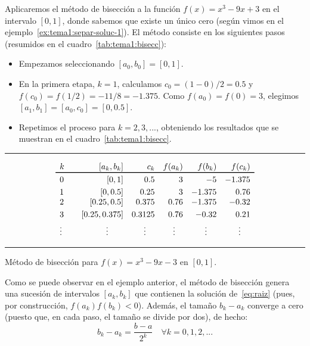 \begin{example}
  Aplicaremos el método de bisección a la función $f(x)=x^3-9x+3$ en el intervalo
  $[0,1]$, donde sabemos que existe un único cero (según vimos en el
  ejemplo~\ref{ex:tema1:separ-soluc-1}). El método consiste en los
  siguientes pasos (resumidos en el cuadro~\ref{tab:tema1:bisecc}):

  \begin{itemize}
  \item Empezamos seleccionando $[a_0,b_0]=[0,1]$.
  \item En la primera etapa, $k=1$, calculamos 
    $c_0=(1-0)/2=0.5$  y 
    $f(c_0)=f(1/2)=-11/8=-1.375$. Como $f(a_0)=f(0)=3$, elegimos
    $[a_1,b_1]=[a_0,c_0]=[0,0.5]$.
  \item Repetimos el proceso para $k=2,3,...$, obteniendo los resultados que se
    muestran en el cuadro~\ref{tab:tema1:bisecc}.
  \end{itemize}

\end{example}
\begin{table}
  \centering
  \rule{0.99\linewidth}{1.6pt}
  \begin{equation*}
    \begin{array}{l<{\quad}rrrrr}%
     k &  [a_k,b_k] & c_k & f(a_k) & f(b_k) & f(c_k) 
      \\ \toprule%
     0 & [0,1]  &  0.5 
      & 3 & -5 & -1.375
      \\ \noalign{\smallskip}
     1 &  [0,0.5] &  0.25
      & 3 & -1.375 & 0.76
      \\ \smallskip
     2 & [0.25,0.5] & 0.375
      & 0.76 & -1.375 & -0.32
     \\ \smallskip
     3& [0.25,0.375] & 0.3125
      & 0.76 & -0.32 & 0.21
      \\
      \hfill \vdots \hfill~ & \hfill \vdots \hfill~ & 
      \hfill \vdots \hfill~ & \hfill \vdots \hfill~ & 
      \hfill \vdots \hfill~ & \hfill \vdots \hfill~
    \end{array}
  \end{equation*}
  \rule{0.99\linewidth}{1.5pt}
  \caption{Método de bisección para $f(x)=x^3-9x-3$ en $[0,1]$.}
  \label{tab:tema1:bisecc}
\end{table}

Como se puede observar en el ejemplo anterior, el método de bisección
genera una sucesión de intervalos $[a_k,b_k]$ que
contienen la solución de~\eqref{eq:raiz} (pues, por construcción,
$f(a_k)f(b_k)<0$). Además, el tamaño $b_k-a_k$ converge a cero (puesto
que, en cada paso, el tamaño se divide por dos), de hecho:
\begin{equation}
  \label{eq:tema1:bisec:1}
  b_k-a_k = \frac{b-a}{2^k} \quad \forall k=0,1,2,...
\end{equation}

